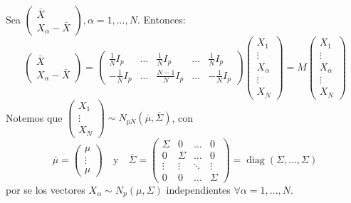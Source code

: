 \documentclass[11pt,a4paper]{article}
\begin{document}
\begin{enumerate}[label=\arabic*.]
\begin{enumerate}[label=(\alph*)]
Sea $\begin{pmatrix} \bar{X} \\ X_{\alpha}-\bar{X} \end{pmatrix}, \alpha = 1, \dots, N$. Entonces:
$$\begin{pmatrix} \bar{X} \\ X_{\alpha}-\bar{X} \end{pmatrix} = \begin{pmatrix}
\frac{1}{N} I_{p} & \dots & \frac{1}{N}I_{p} & \dots & \frac{1}{N}I_{p} \\
-\frac{1}{N}I_{p} & \dots & \frac{N-1}{N}I_{p} & \dots & -\frac{1}{N}I_{p}
\end{pmatrix} \begin{pmatrix}
X_{1} \\ \vdots \\ X_{\alpha} \\ \vdots \\ X_{N}
\end{pmatrix} = M \begin{pmatrix}
X_{1} \\ \vdots \\ X_{\alpha} \\ \vdots \\ X_{N}
\end{pmatrix}$$
Notemos que $\begin{pmatrix} X_{1} \\ \vdots \\ X_{N} \end{pmatrix} \sim N_{pN}(\bar{\mu}, \bar{\Sigma})$, con 
$$\bar{\mu} = \begin{pmatrix} \mu \\ \vdots \\ \mu \end{pmatrix} \quad \text{y} \quad \bar{\Sigma} = \begin{pmatrix}
\Sigma & 0 & \dots & 0 \\
0 & \Sigma & \dots & 0 \\
\vdots & \vdots & \ddots & \vdots \\
0 & 0 & \dots & \Sigma
\end{pmatrix} = \operatorname{diag}(\Sigma, \dots, \Sigma)$$
por se los vectores $X_{\alpha} \sim N_{p}(\mu, \Sigma)$ independientes $\forall \alpha = 1, \dots, N$.


\end{enumerate}
\end{enumerate}
\end{document}

